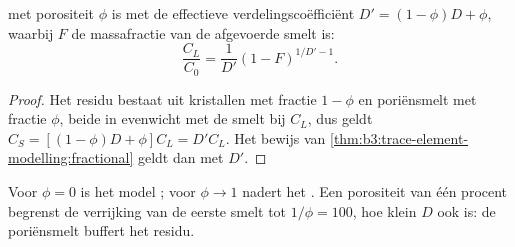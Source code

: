 \begin{proposition}\label{prop:b3:trace-element-modelling:dynamic}
 met porositeit $\phi$ is  met de effectieve
verdelingscoëfficiënt $D' = (1 - \phi)D + \phi$, waarbij $F$ de massafractie
van de afgevoerde smelt is:
\[
\frac{C_L}{C_0} = \frac{1}{D'}(1 - F)^{1/D' - 1}.
\]
\end{proposition}

\begin{proof}
Het residu bestaat uit kristallen met fractie $1 - \phi$ en poriënsmelt met
fractie $\phi$, beide in evenwicht met de smelt bij $C_L$, dus geldt
$C_S = [(1 - \phi)D + \phi]C_L = D'C_L$. Het bewijs van
\cref{thm:b3:trace-element-modelling:fractional} geldt dan met $D'$.
\end{proof}

Voor $\phi = 0$ is het model ; voor $\phi \to 1$
nadert het . Een porositeit van één procent begrenst de verrijking van de
eerste smelt tot $1/\phi = 100$, hoe klein $D$ ook is: de poriënsmelt
buffert het residu.

